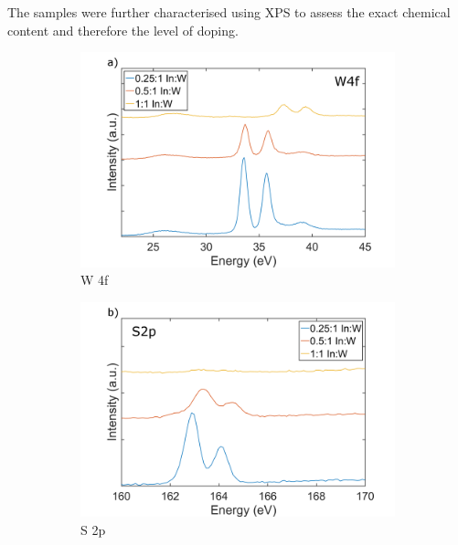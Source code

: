 The samples were further characterised using XPS to assess the exact chemical content and therefore the level of doping.

\begin{figure}[H]
	\begin{center}
		\begin{subfigure}[b]{0.6\textwidth}
			\includegraphics[width=\textwidth]{In/XPSW4f.png}
			\caption{W 4f}
			\label{fig:InXPSW4f}
		\end{subfigure}
		\qquad
		\begin{subfigure}[b]{0.6\textwidth}
			\includegraphics[width=\textwidth]{In/XPSS2p.png}
			\caption{S 2p}
			\label{fig:InXPSS2p}
		\end{subfigure}
		\begin{subfigure}[b]{0.6\textwidth}

\end{subfigure}
\end{center}
\end{figure}
